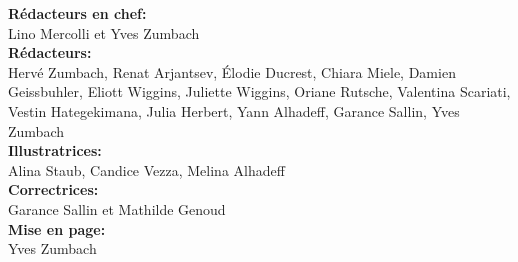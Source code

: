 \documentclass{parch}
\begin{document}
	\vspace*{\baselineskip}
	\begin{multicols}{2}
		\noindent\textbf{Rédacteurs en chef:}\\
		Lino Mercolli et Yves Zumbach\\
		\textbf{Rédacteurs:}\\
		Hervé Zumbach, Renat Arjantsev, Élodie Ducrest, Chiara Miele, Damien Geissbuhler, Eliott Wiggins, Juliette Wiggins, Oriane Rutsche, Valentina Scariati, Vestin Hategekimana, Julia Herbert, Yann Alhadeff, Garance Sallin, Yves Zumbach\\
		\textbf{Illustratrices:}\\
		Alina Staub, Candice Vezza, Melina Alhadeff\\
		\noindent\textbf{Correctrices:}\\
		Garance Sallin et Mathilde Genoud\\
		\textbf{Mise en page:}\\
		Yves Zumbach
	\end{multicols}
	
	\newpage
	
	
\end{document}
